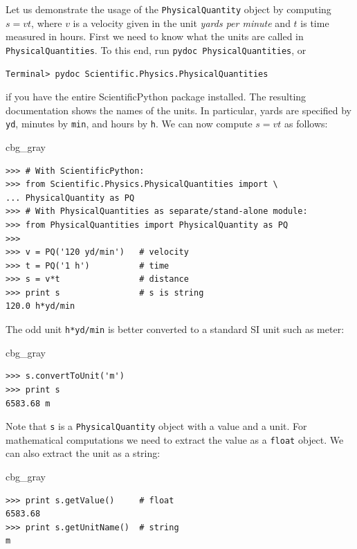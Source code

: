 \documentclass[graybox,envcountchap,sectrefs,final]{svmonodo}
\newenvironment{_cod_tight}[1]{
   \def\FrameCommand{\colorbox{#1}}
   \FrameRule0.6pt\MakeFramed {\FrameRestore}\vskip3mm}
   {\vskip0mm\endMakeFramed}
\newenvironment{cod}[1]{
\bgroup\rmfamily
\fboxsep=0mm\relax
\begin{_cod_tight}{#1}
\list{}{\parsep=-2mm\parskip=0mm\topsep=0pt\leftmargin=2mm
\rightmargin=2\leftmargin\leftmargin=4pt\relax}
\item\relax}
{\endlist\end{_cod_tight}\egroup}
\begin{document}
Let us demonstrate the usage of the \texttt{PhysicalQuantity} object by
computing $s=vt$, where $v$ is a velocity given in the unit \emph{yards per
minute} and $t$ is time measured in hours.  First we need to know what
the units are called in \texttt{PhysicalQuantities}.  To this end, run \texttt{pydoc PhysicalQuantities}, or

\begin{Verbatim}[frame=lines,label=\fbox{{\tiny Terminal}},framesep=2.5mm,framerule=0.7pt,fontsize=\fontsize{9pt}{9pt}]
Terminal> pydoc Scientific.Physics.PhysicalQuantities
\end{Verbatim}
if you have the entire ScientificPython package installed. The
resulting documentation shows the names of
the units. In particular,
yards are specified by \texttt{yd}, minutes by \texttt{min}, and hours
by \texttt{h}. We can now compute $s=vt$ as follows:

\begin{cod}{cbg_gray}\begin{Verbatim}[numbers=none,fontsize=\fontsize{9pt}{9pt},baselinestretch=0.95,xleftmargin=2mm]
>>> # With ScientificPython:
>>> from Scientific.Physics.PhysicalQuantities import \ 
... PhysicalQuantity as PQ
>>> # With PhysicalQuantities as separate/stand-alone module:
>>> from PhysicalQuantities import PhysicalQuantity as PQ
>>>
>>> v = PQ('120 yd/min')   # velocity
>>> t = PQ('1 h')          # time
>>> s = v*t                # distance
>>> print s                # s is string
120.0 h*yd/min
\end{Verbatim}
\end{cod}
\noindent
The odd unit \texttt{h*yd/min} is better converted to a standard SI unit such
as meter:

\begin{cod}{cbg_gray}\begin{Verbatim}[numbers=none,fontsize=\fontsize{9pt}{9pt},baselinestretch=0.95,xleftmargin=2mm]
>>> s.convertToUnit('m')
>>> print s
6583.68 m
\end{Verbatim}
\end{cod}
\noindent
Note that \texttt{s} is a \texttt{PhysicalQuantity} object with a value and a
unit. For mathematical computations we need to extract the
value as a \texttt{float} object. We can also extract the unit as a string:

\begin{cod}{cbg_gray}\begin{Verbatim}[numbers=none,fontsize=\fontsize{9pt}{9pt},baselinestretch=0.95,xleftmargin=2mm]
>>> print s.getValue()     # float
6583.68
>>> print s.getUnitName()  # string
m
\end{Verbatim}
\end{cod}
\noindent
\end{document}
